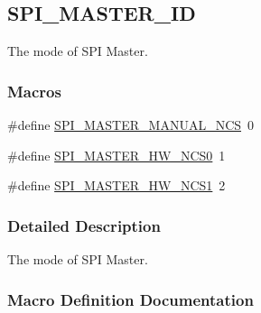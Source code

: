 \hypertarget{group___s_p_i___m_a_s_t_e_r___i_d}{}\subsection{S\+P\+I\+\_\+\+M\+A\+S\+T\+E\+R\+\_\+\+ID}
\label{group___s_p_i___m_a_s_t_e_r___i_d}


The mode of S\+PI Master.  


\subsubsection*{Macros}
\begin{DoxyCompactItemize}
\item 
\#define \hyperlink{group___s_p_i___m_a_s_t_e_r___i_d_gadd7a6c1d40d22d45a6bd0db409f43c21}{S\+P\+I\+\_\+\+M\+A\+S\+T\+E\+R\+\_\+\+M\+A\+N\+U\+A\+L\+\_\+\+N\+CS}~0
\item 
\#define \hyperlink{group___s_p_i___m_a_s_t_e_r___i_d_gadb7b5084b31c86051d4c85ff70fe238f}{S\+P\+I\+\_\+\+M\+A\+S\+T\+E\+R\+\_\+\+H\+W\+\_\+\+N\+C\+S0}~1
\item 
\#define \hyperlink{group___s_p_i___m_a_s_t_e_r___i_d_ga93c562fd6b694c554b76ff75590afe93}{S\+P\+I\+\_\+\+M\+A\+S\+T\+E\+R\+\_\+\+H\+W\+\_\+\+N\+C\+S1}~2
\end{DoxyCompactItemize}


\subsubsection{Detailed Description}
The mode of S\+PI Master. 



\subsubsection{Macro Definition Documentation}
